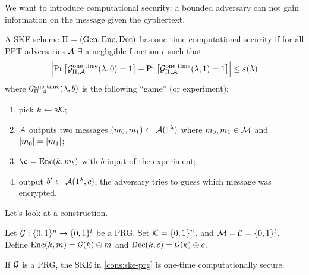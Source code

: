 We want to introduce computational security: a bounded adversary can not gain information on the message given the cyphertext.
\begin{definition}
	A \ac{SKE} scheme $\Pi_{} = \left( \mathrm{Gen} , \allowbreak \mathrm{Enc} , \allowbreak \mathrm{Dec} \right)$ has one time computational security if for all \ac{PPT} adversaries $\mathcal{A}$ $\exists$ a negligible function $\epsilon$ such that
	\begin{equation*}
		\left|{
			\mathop{\mathrm{Pr}}\limits_{} \left[ {\mathcal{G}^{\scriptstyle \text{one time}}_{\Pi_{}, \mathcal{A}}(\lambda, 0) = 1} \right]
			-
			\mathop{\mathrm{Pr}}\limits_{} \left[ {\mathcal{G}^{\scriptstyle \text{one time}}_{\Pi_{}, \mathcal{A}}(\lambda, 1) = 1} \right]
		}\right|
		\le \varepsilon(\lambda)
	\end{equation*}
	where $\mathcal{G}^{\scriptstyle \text{one time}}_{\Pi_{}, \mathcal{A}}(\lambda, b)$ is the following ``game'' (or experiment):
	\begin{enumerate}
		\item pick $k \leftarrow {\scriptstyle \$} {\mathcal{K}}$;
		\item $\mathcal{A}$ outputs two messages $(m_0, m_1) \leftarrow \mathcal{A}(1^{\lambda})$ where $m_0, m_1 \in \mathcal{M}$ and $\left|{m_0}\right| = \left|{m_1}\right|$;
		\item $\c = \SKEEnc(k, m_b)$ with $b$ input of the experiment;
		\item output $b' \leftarrow \mathcal{A}(1^{\lambda}, c)$, \ie the adversary tries to guess which message was encrypted. \qedhere
	\end{enumerate}
\end{definition}

Let's look at a construction.
\begin{construction} \label{cons:ske-prg}
	Let $\mathcal{G} : \{0,1\}^{n} \to \{0,1\}^{l}$ be a \ac{PRG}.
	Set $\mathcal{K} = \{0,1\}^{n}$, and $\mathcal{M} = \mathcal{C} = \{0,1\}^{l}$.
	Define $\mathrm{Enc}(k,m) = \mathcal{G}(k) \oplus m$ and $\mathrm{Dec}(k,c) = \mathcal{G}(k) \oplus c$.
\end{construction}

\begin{theorem} \label{thm:ske-prg}
	If $\mathcal{G}$ is a \ac{PRG}, the \ac{SKE} in \cref{cons:ske-prg} is one-time computationally secure.
\end{theorem}

